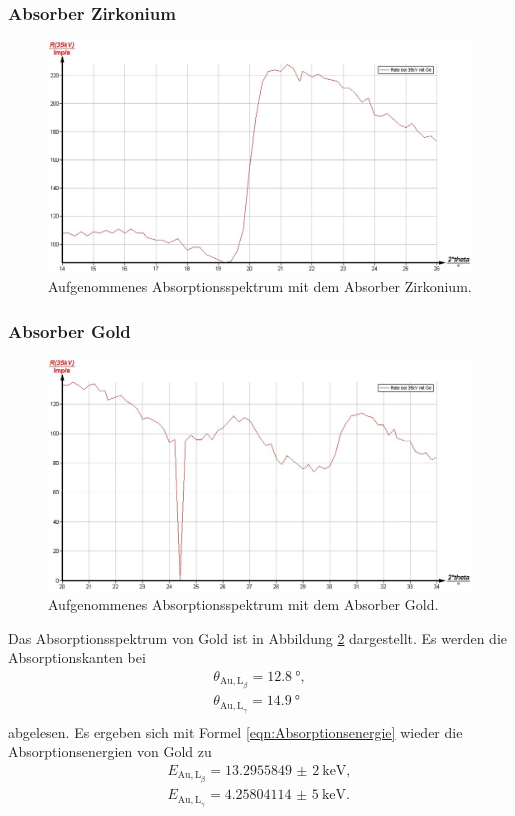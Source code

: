 \FloatBarrier
\subsubsection{Absorber Zirkonium}
\begin{figure}
	\includegraphics[width=1.0\textwidth]{nIKO_und_jULIAN_ÜLADS/zirkonium.jpg}
	\caption{Aufgenommenes Absorptionsspektrum mit dem Absorber Zirkonium.}
	\label{fig:zirkonium_absorber}
\end{figure}

\FloatBarrier
\subsubsection{Absorber Gold}
\begin{figure}
	\includegraphics[width=1.0\textwidth]{nIKO_und_jULIAN_ÜLADS/gold.jpg}
	\caption{Aufgenommenes Absorptionsspektrum mit dem Absorber Gold.}
	\label{fig:gold_absorber}
\end{figure}
Das Absorptionsspektrum von Gold ist in Abbildung \ref{fig:gold_absorber} dargestellt.
Es werden die Absorptionskanten bei
\begin{gather*}
	\theta_{\mathrm{Au,L}_{\beta}} = \SI{12,8}{\degree} \mathrm{,} \\
	\theta_{\mathrm{Au,L}_{\gamma}} = \SI{14,9}{\degree} \\
\end{gather*}
abgelesen.
Es ergeben sich mit Formel \eqref{eqn:Absorptionsenergie} wieder die Absorptionsenergien von
Gold zu
\begin{gather*}
	E_{\mathrm{Au,L}_{\beta}} = \SI{13,2955849(2)}{\kilo\electronvolt} \mathrm{,} \\
	E_{\mathrm{Au,L}_{\gamma}} = \SI{4,25804114(5)}{\kilo\electronvolt} \mathrm{.} \\
\end{gather*}
